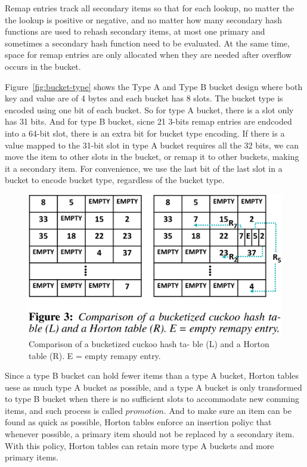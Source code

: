 \documentclass[12pt,conference,compsoc]{IEEEtran}
\begin{document}
Remap entries track all secondary items so that for each lookup, no matter the the lookup is positive or negative, and no matter how many secondary hash functions are used to rehash secondary items, at most one primary and sometimes a secondary hash function need to be evaluated. At the same time, space for remap entries are only allocated when they are needed after overflow occurs in the bucket.

Figure~\ref{fig:bucket-type} shows the Type A and Type B bucket design where both key and value are of 4 bytes and each bucket has 8 slots. The bucket type is encoded using one bit of each bucket. So for type A bucket, there is a slot only has 31 bits. And for type B bucket, sicne 21 3-bits remap entries are endcoded into a 64-bit slot, there is an extra bit for bucket type encoding. If there is a value mapped to the 31-bit slot in type A bucket requires all the 32 bits, we can move the item to other slots in the bucket, or remap it to other buckets, making it a secondary item. For convenience, we use the last bit of the last slot in a bucket to encode bucket type, regardless of the bucket type.

\begin{figure}
    \centering
    \includegraphics[width=\linewidth]{BCHT-Horton.png}
    \caption{Comparison of a bucketized cuckoo hash ta- ble (L) and a Horton table (R). E = empty remapy entry.} \label{fig:BCHT-Horton}
\end{figure}

Since a type B bucket can hold fewer items than a type A bucket, Horton tables uese as much type A bucket as possible, and a type A bucket is only transformed to type B bucket when there is no sufficient slots to accommodate new comming items, and such process is called $promotion$. And to make sure an item can be found as quick as possible, Horton tables enforce an insertion poliyc that whenever possible, a primary item should not be replaced by a secondary item. With this policy, Horton tables can retain more type A buckets and more primary items. 
\end{document}
